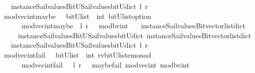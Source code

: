 \begin{isabellebody}
\ \ \ instance{\isacharunderscore}Sail{}{\isacharunderscore}values{\isacharunderscore}BitU{\isacharunderscore}Sail{}{\isacharunderscore}values{\isacharunderscore}bitU{\isacharunderscore}dict{\isacharparenright}\ l\ r{\isacharparenright}{\isacharparenright}{\isachardoublequoteclose}\isanewline
\isanewline
{}\isamarkupfalse%
\ mod{\isacharunderscore}vec{\isacharunderscore}int{\isacharunderscore}maybe\ \ {\isacharcolon}{\isacharcolon}\ {\isachardoublequoteopen}{\isacharparenleft}bitU{\isacharparenright}list\ {\isasymRightarrow}\ int\ {\isasymRightarrow}{\isacharparenleft}{\isacharparenleft}bitU{\isacharparenright}list{\isacharparenright}option\ {\isachardoublequoteclose}\ \ \ \isanewline
\ \ \ \ \ {\isachardoublequoteopen}\ mod{\isacharunderscore}vec{\isacharunderscore}int{\isacharunderscore}maybe\ \ l\ r\ {\isacharequal}\ {\isacharparenleft}\ mod{\isacharunderscore}bv{\isacharunderscore}int\ \isanewline
\ \ {\isacharparenleft}instance{\isacharunderscore}Sail{}{\isacharunderscore}values{\isacharunderscore}Bitvector{\isacharunderscore}list{\isacharunderscore}dict\isanewline
\ \ \ \ \ instance{\isacharunderscore}Sail{}{\isacharunderscore}values{\isacharunderscore}BitU{\isacharunderscore}Sail{}{\isacharunderscore}values{\isacharunderscore}bitU{\isacharunderscore}dict{\isacharparenright}\ {\isacharparenleft}instance{\isacharunderscore}Sail{}{\isacharunderscore}values{\isacharunderscore}Bitvector{\isacharunderscore}list{\isacharunderscore}dict\isanewline
\ \ \ instance{\isacharunderscore}Sail{}{\isacharunderscore}values{\isacharunderscore}BitU{\isacharunderscore}Sail{}{\isacharunderscore}values{\isacharunderscore}bitU{\isacharunderscore}dict{\isacharparenright}\ l\ r\ {\isacharparenright}{\isachardoublequoteclose}\isanewline
\isanewline
{}\isamarkupfalse%
\ mod{\isacharunderscore}vec{\isacharunderscore}int{\isacharunderscore}fail\ \ {\isacharcolon}{\isacharcolon}\ {\isachardoublequoteopen}{\isacharparenleft}bitU{\isacharparenright}list\ {\isasymRightarrow}\ int\ {\isasymRightarrow}{\isacharparenleft}{\isacharprime}rv{\isacharcomma}{\isacharparenleft}{\isacharparenleft}bitU{\isacharparenright}list{\isacharparenright}{\isacharcomma}{\isacharprime}e{\isacharparenright}monad\ {\isachardoublequoteclose}\ \ \ \isanewline
\ \ \ \ \ {\isachardoublequoteopen}\ mod{\isacharunderscore}vec{\isacharunderscore}int{\isacharunderscore}fail\ \ \ l\ r\ {\isacharequal}\ {\isacharparenleft}\ maybe{\isacharunderscore}fail\ {\isacharparenleft}{\isacharprime}{\isacharprime}mod{\isacharunderscore}vec{\isacharunderscore}int{\isacharprime}{\isacharprime}{\isacharparenright}\ {\isacharparenleft}mod{\isacharunderscore}bv{\isacharunderscore}int\ \isanewline

\end{isabellebody}
